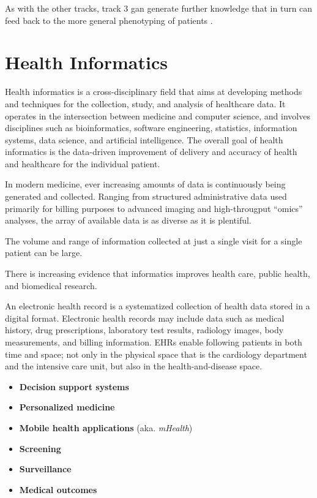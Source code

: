 As with the other tracks, track 3 gan generate further knowledge 
that in turn can feed back to the more general phenotyping of patients
\autocite{konigWhat2017}. 


\section{Health Informatics}

Health informatics is a cross-disciplinary field
that aims at developing methods and techniques
for the collection, study, and analysis of healthcare data.
It operates in the intersection between medicine and computer science,
and involves disciplines such as
bioinformatics, software engineering, statistics, information systems,
data science, and artificial intelligence.
The overall goal of health informatics is the data-driven improvement
of delivery and accuracy of health and healthcare for the individual patient.

In modern medicine, 
ever increasing amounts of data 
is continuously being generated and collected.
Ranging from structured administrative data 
used primarily for billing purposes
to advanced imaging and high-througput \enquote{omics} analyses,
the array of available data is as diverse as it is plentiful.

The volume and range of information collected
at just a single visit for a single patient
can be large.


There is increasing evidence that informatics improves
health care, public health, and biomedical research.

    
An electronic health record
is a systematized collection of health data 
stored in a digital format.
Electronic health records may include data such as
medical history, drug prescriptions, laboratory test results,
radiology images, body measurements, and billing information.
EHRs enable following patients in both time and space;
not only in the physical space that is the cardiology department
and the intensive care unit, but also in the health-and-disease space.

\begin{itemize}
    \item \textbf{Decision support systems}
    \item \textbf{Personalized medicine}
    \item \textbf{Mobile health applications} (aka. \textit{mHealth})
    \item \textbf{Screening}
    \item \textbf{Surveillance}
    \item \textbf{Medical outcomes}
\end{itemize}

